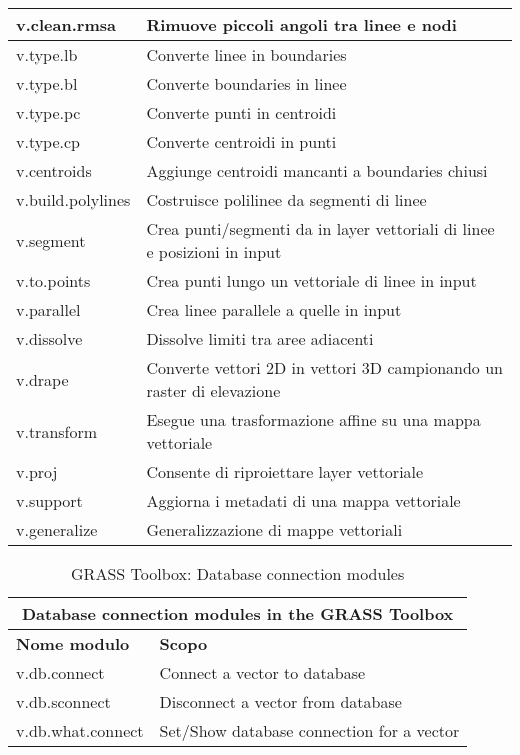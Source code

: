 \begin{table}[ht]
\begin{tabular}{|p{4cm}|p{12cm}|}
  \hline v.clean.rmsa & Rimuove piccoli angoli tra linee e nodi \\
  \hline v.type.lb & Converte linee in boundaries \\
  \hline v.type.bl & Converte boundaries in linee \\
  \hline v.type.pc & Converte punti in centroidi \\
  \hline v.type.cp & Converte centroidi in punti \\
  \hline v.centroids & Aggiunge centroidi mancanti a boundaries chiusi \\
  \hline v.build.polylines & Costruisce polilinee da segmenti di linee \\
  \hline v.segment & Crea punti/segmenti da in layer vettoriali di linee e posizioni in input \\
  \hline v.to.points & Crea punti lungo un vettoriale di linee in input \\
  \hline v.parallel & Crea linee parallele a quelle in input \\
  \hline v.dissolve & Dissolve limiti tra aree adiacenti \\
  \hline v.drape & Converte vettori 2D in vettori 3D campionando un raster di elevazione \\
  \hline v.transform & Esegue una trasformazione affine su una mappa vettoriale \\
  \hline v.proj & Consente di riproiettare layer vettoriale \\
  \hline v.support & Aggiorna i metadati di una mappa vettoriale \\
  \hline v.generalize & Generalizzazione di mappe vettoriali \\
\hline
\end{tabular}
\end{table}

\begin{table}[ht]
\centering
\caption{GRASS Toolbox: Database connection modules}\medskip
 \begin{tabular}{|p{4cm}|p{12cm}|}
  \hline \multicolumn{2}{|c|}{\textbf{Database connection modules in the GRASS
  Toolbox}} \\
  \hline \textbf{Nome modulo} & \textbf{Scopo} \\
  \hline v.db.connect & Connect a vector to database \\
  \hline v.db.sconnect & Disconnect a vector from database \\
  \hline v.db.what.connect & Set/Show database connection for a vector \\
\hline
\end{tabular}
\end{table}

